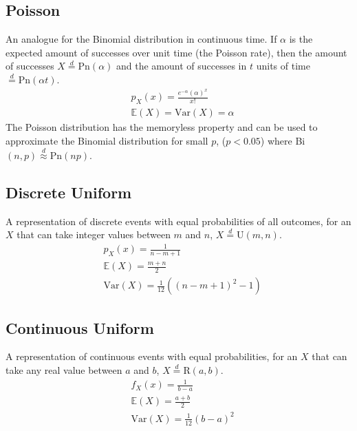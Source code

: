 \documentclass[titlepage,twocolumn]{article}
\begin{document}
\subsection*{Poisson}
An analogue for the Binomial distribution in continuous time. If $\alpha$ is the expected amount of successes over unit time (the Poisson rate), then the amount of successes $X\stackrel{d}{=}\mbox{Pn}(\alpha)$ and the amount of successes in $t$ units of time $\stackrel{d}{=}\mbox{Pn}(\alpha t)$.
\begin{align*}
    &p_X(x)=\frac{e^{-\alpha}(\alpha)^x}{x!}\\
    &\mathbb{E}(X)=\mbox{Var}(X)=\alpha
\end{align*}
The Poisson distribution has the memoryless property and can be used to approximate the Binomial distribution for small $p$, ($p < 0.05$) where Bi$(n,p) \stackrel{d}{\approx}\mbox{Pn}(np)$.

\subsection*{Discrete Uniform}
A representation of discrete events with equal probabilities of all outcomes, for an $X$ that can take integer values between $m$ and $n$, $X\stackrel{d}{=}\mbox{U}(m,n)$.
\begin{align*}
    &p_X(x)=\frac{1}{n-m+1}\\
    &\mathbb{E}(X)=\frac{m+n}{2}\\
    &\mbox{Var}(X)=\frac{1}{12}((n-m+1)^2-1)
\end{align*}

\subsection*{Continuous Uniform}
A representation of continuous events with equal probabilities, for an $X$ that can take any real value between $a$ and $b$, $X\stackrel{d}{=}\mbox{R}(a,b)$.
\begin{align*}
    &f_X(x)=\frac{1}{b-a}\\
    &\mathbb{E}(X)=\frac{a+b}{2}\\
    &\mbox{Var}(X)=\frac{1}{12}(b-a)^2
\end{align*}
\end{document}
